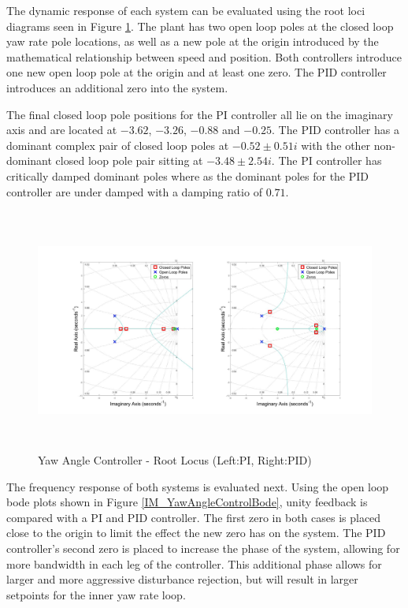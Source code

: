 	The dynamic response of each system can be evaluated using the root loci diagrams seen in Figure \ref{IM_YawAngleControlRoot}. The plant has two open loop poles at the closed loop yaw rate pole locations, as well as a new pole at the origin introduced by the mathematical relationship between speed and position. Both controllers introduce one new open loop pole at the origin and at least one zero. The PID controller introduces an additional zero into the system.  
	
	The final closed loop pole positions for the PI controller all lie on the imaginary axis and are located at $-3.62$, $-3.26$, $-0.88$ and $-0.25$. The PID controller has a dominant complex pair of closed loop poles at $-0.52 \pm 0.51 i$ with the other non-dominant closed loop pole pair sitting at $-3.48 \pm 2.54 i$. The PI controller has critically damped dominant poles where as the dominant poles for the PID controller are under damped with a damping ratio of $0.71$.
	
	\begin{figure}[H]
		\centering
		\includegraphics[height = 8cm]{../Design/Matlab/Controllers/yaw_angle_root.jpg}
		\caption{Yaw Angle Controller -  Root Locus (Left:PI, Right:PID)}
		\label{IM_YawAngleControlRoot}
	\end{figure}
	
	The frequency response of both systems is evaluated next. Using the open loop bode plots shown in Figure \ref{IM_YawAngleControlBode}, unity feedback is compared with a PI and PID controller. The first zero in both cases is placed close to the origin to limit the effect the new zero has on the system. The PID controller's second zero is placed to increase the phase of the system, allowing for more bandwidth in each leg of the controller. This additional phase allows for larger and more aggressive disturbance rejection, but will result in larger setpoints for the inner yaw rate loop.
	
